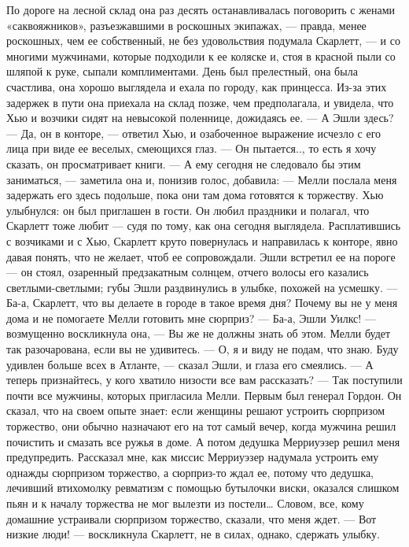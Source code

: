 По дороге на лесной склад она раз десять останавливалась поговорить с женами «саквояжников», разъезжавшими в роскошных экипажах, — правда, менее роскошных, чем ее собственный, не без удовольствия подумала Скарлетт, — и со многими мужчинами, которые подходили к ее коляске и, стоя в красной пыли со шляпой к руке, сыпали комплиментами. День был прелестный, она была счастлива, она хорошо выглядела и ехала по городу, как принцесса. Из-за этих задержек в пути она приехала на склад позже, чем предполагала, и увидела, что Хью и возчики сидят на невысокой поленнице, дожидаясь ее.
— А Эшли здесь?
— Да, он в конторе, — ответил Хью, и озабоченное выражение исчезло с его лица при виде ее веселых, смеющихся глаз. — Он пытается.., то есть я хочу сказать, он просматривает книги.
— А ему сегодня не следовало бы этим заниматься, — заметила она и, понизив голос, добавила: — Мелли послала меня задержать его здесь подольше, пока они там дома готовятся к торжеству.
Хью улыбнулся: он был приглашен в гости. Он любил праздники и полагал, что Скарлетт тоже любит — судя по тому, как она сегодня выглядела. Расплатившись с возчиками и с Хью, Скарлетт круто повернулась и направилась к конторе, явно давая понять, что не желает, чтоб ее сопровождали. Эшли встретил ее на пороге — он стоял, озаренный предзакатным солнцем, отчего волосы его казались светлыми-светлыми; губы Эшли раздвинулись в улыбке, похожей на усмешку.
— Ба-а, Скарлетт, что вы делаете в городе в такое время дня? Почему вы не у меня дома и не помогаете Мелли готовить мне сюрприз?
— Ба-а, Эшли Уилкс! — возмущенно воскликнула она, — Вы же не должны знать об этом. Мелли будет так разочарована, если вы не удивитесь.
— О, я и виду не подам, что знаю. Буду удивлен больше всех в Атланте, — сказал Эшли, и глаза его смеялись.
— А теперь признайтесь, у кого хватило низости все вам рассказать?
— Так поступили почти все мужчины, которых пригласила Мелли. Первым был генерал Гордон. Он сказал, что на своем опыте знает: если женщины решают устроить сюрпризом торжество, они обычно назначают его на тот самый вечер, когда мужчина решил почистить и смазать все ружья в доме. А потом дедушка Мерриуэзер решил меня предупредить. Рассказал мне, как миссис Мерриуэзер надумала устроить ему однажды сюрпризом торжество, а сюрприз-то ждал ее, потому что дедушка, лечивший втихомолку ревматизм с помощью бутылочки виски, оказался слишком пьян и к началу торжества не мог вылезти из постели… Словом, все, кому домашние устраивали сюрпризом торжество, сказали, что меня ждет.
— Вот низкие люди! — воскликнула Скарлетт, не в силах, однако, сдержать улыбку.
